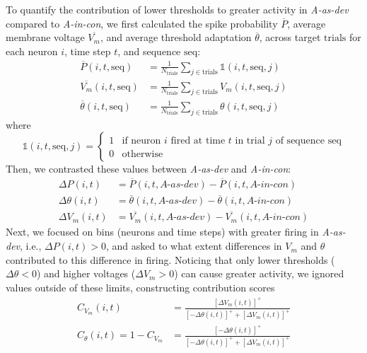 \documentclass[10pt,letterpaper]{article}
\newcommand{\dev}{\textit{A-as-dev}}
\newcommand{\msc}{\textit{A-in-con}}
\begin{document}
To quantify the contribution of lower thresholds to greater activity in \dev{} compared to \msc{}, we first calculated the spike probability $\overline P$, average membrane voltage $\overline{V_m}$, and average threshold adaptation $\overline \theta$, across target $\mathrm{trials}$ for each neuron $i$, time step $t$, and sequence $\mathrm{seq}$:
\begin{align}
    \overline{P}(i,t,\mathrm{seq}) &= \frac{1}{N_{\mathrm{trials}}} \sum_{j \in \mathrm{trials}} \mathbb{1}(i,t,\mathrm{seq},j) \nonumber \\
    \overline{V_m}(i,t,\mathrm{seq}) &= \frac{1}{N_{\mathrm{trials}}} \sum_{j \in \mathrm{trials}} V_m(i,t,\mathrm{seq},j) \label{eq:hist_raw} \\
    \overline{\theta}(i,t,\mathrm{seq}) &= \frac{1}{N_{\mathrm{trials}}} \sum_{j \in \mathrm{trials}} \theta(i,t,\mathrm{seq},j) \nonumber
\end{align}
where
\begin{equation*}
    \mathbb{1}(i,t,\mathrm{seq},j) =
    \begin{cases}
        1 & \text{if neuron $i$ fired at time $t$ in trial $j$ of sequence $\mathrm{seq}$}\\
        0 & \text{otherwise}
    \end{cases}
\end{equation*}
Then, we contrasted these values between \dev{} and \msc{}:
\begin{align}
    \Delta P(i,t) &= \overline{P}(i,t,\dev{}) - \overline{P}(i,t,\msc{}) \nonumber \\
    \Delta \theta(i,t) &= \overline{\theta}(i,t,\dev{}) - \overline{\theta}(i,t,\msc{}) \label{eq:hist_contrast} \\
    \Delta V_m(i,t) &= \overline{V_m}(i,t,\dev{}) - \overline{V_m}(i,t,\msc{}) \nonumber
\end{align}
Next, we focused on bins (neurons and time steps) with greater firing in \dev{}, i.e., $\Delta P(i,t) > 0$, and asked to what extent differences in $V_m$ and $\theta$ contributed to this difference in firing. Noticing that only lower thresholds ($\Delta \theta < 0$) and higher voltages ($\Delta V_m > 0$) can cause greater activity, we ignored values outside of these limits, constructing contribution scores
\begin{align}
    C_{V_m}(i,t) &= \frac{[\Delta V_m(i,t)]^+}{[-\Delta \theta(i,t)]^+ + [\Delta V_m(i,t)]^+} \nonumber \\
    C_\theta(i,t) = 1-C_{V_m} &= \frac{[-\Delta \theta(i,t)]^+}{[-\Delta \theta(i,t)]^+ + [\Delta V_m(i,t)]^+} \label{eq:hist_contrib}
\end{align}
\end{document}
